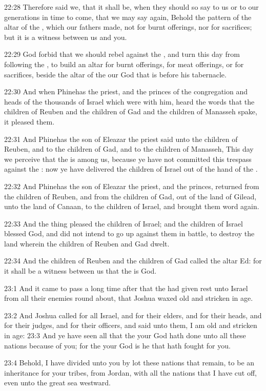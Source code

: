 22:28 Therefore said we, that it shall be, when they should so say to
us or to our generations in time to come, that we may say again,
Behold the pattern of the altar of the \LORD, which our fathers made,
not for burnt offerings, nor for sacrifices; but it is a witness
between us and you.

22:29 God forbid that we should rebel against the \LORD, and turn this
day from following the \LORD, to build an altar for burnt offerings,
for meat offerings, or for sacrifices, beside the altar of the \LORD
our God that is before his tabernacle.

22:30 And when Phinehas the priest, and the princes of the
congregation and heads of the thousands of Israel which were with him,
heard the words that the children of Reuben and the children of Gad
and the children of Manasseh spake, it pleased them.

22:31 And Phinehas the son of Eleazar the priest said unto the
children of Reuben, and to the children of Gad, and to the children of
Manasseh, This day we perceive that the \LORD is among us, because ye
have not committed this trespass against the \LORD: now ye have
delivered the children of Israel out of the hand of the \LORD.

22:32 And Phinehas the son of Eleazar the priest, and the princes,
returned from the children of Reuben, and from the children of Gad,
out of the land of Gilead, unto the land of Canaan, to the children of
Israel, and brought them word again.

22:33 And the thing pleased the children of Israel; and the children
of Israel blessed God, and did not intend to go up against them in
battle, to destroy the land wherein the children of Reuben and Gad
dwelt.

22:34 And the children of Reuben and the children of Gad called the
altar Ed: for it shall be a witness between us that the \LORD is God.

23:1 And it came to pass a long time after that the \LORD had given
rest unto Israel from all their enemies round about, that Joshua waxed
old and stricken in age.

23:2 And Joshua called for all Israel, and for their elders, and for
their heads, and for their judges, and for their officers, and said
unto them, I am old and stricken in age: 23:3 And ye have seen all
that the \LORD your God hath done unto all these nations because of
you; for the \LORD your God is he that hath fought for you.

23:4 Behold, I have divided unto you by lot these nations that remain,
to be an inheritance for your tribes, from Jordan, with all the
nations that I have cut off, even unto the great sea westward.

